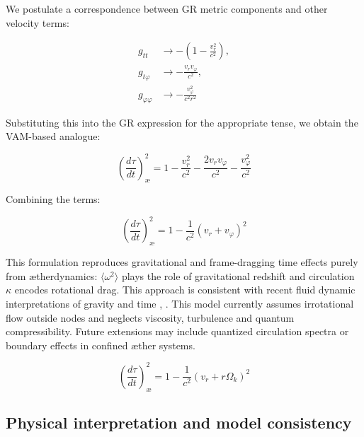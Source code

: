 We postulate a correspondence between GR metric components and other velocity terms:

\begin{equation}
 \begin{aligned}
  g_{tt} &\rightarrow -\left(1 - \frac{v_r^2}{c^2}\right), \\
  g_{t\varphi} &\rightarrow -\frac{v_r v_\varphi}{c^2}, \\
  g_{\varphi\varphi} &\rightarrow -\frac{v_\varphi^2}{c^2 r^2}
 \end{aligned}
 \label{eq:VAM_metric_terms}
\end{equation}

Substituting this into the GR expression for the appropriate tense, we obtain the VAM-based analogue:

\begin{equation}
 \left( \frac{d\tau}{dt} \right)^2_\text{\ae} = 1 - \frac{v_r^2}{c^2} - \frac{2v_r v_\varphi}{c^2} - \frac{v_\varphi^2}{c^2}
 \label{eq:VAM_proper_time}
\end{equation}

Combining the terms:

\begin{equation}
 \left( \frac{d\tau}{dt} \right)^2_\text{\ae} = 1 - \frac{1}{c^2}(v_r + v_\varphi)^2
 \label{eq:VAM_proper_time_combined}
\end{equation}

This formulation reproduces gravitational and frame-dragging time effects purely from ætherdynamics: $\langle \omega^2 \rangle$ plays the role of gravitational redshift and circulation $\kappa$ encodes rotational drag. This approach is consistent with recent fluid dynamic interpretations of gravity and time \cite{barcelo2011analogue}, \cite{fedi2017gravity}.
This model currently assumes irrotational flow outside nodes and neglects viscosity, turbulence and quantum compressibility. Future extensions may include quantized circulation spectra or boundary effects in confined æther systems.

\begin{equation}
 \boxed{\left( \frac{d\tau}{dt} \right)^2_\text{\ae} = 1 - \frac{1}{c^2}(v_r + r\Omega_k)^2}
 \label{eq:VAM_proper_time_final}
\end{equation}

\subsection{Physical interpretation and model consistency}

